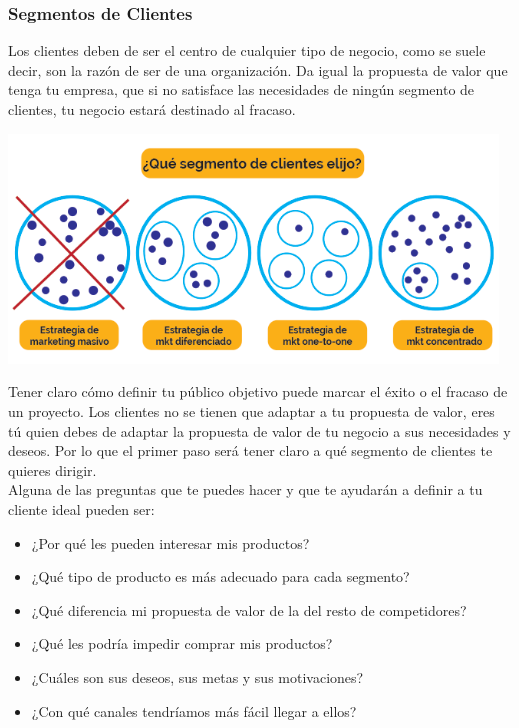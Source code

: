 \documentclass[preprint,12pt]{elsarticle}
\begin{document}
\subsubsection{Segmentos de Clientes}
Los clientes deben de ser el centro de cualquier tipo de negocio, como se suele decir, son la razón de ser de una organización.
Da igual la propuesta de valor que tenga tu empresa, que si no satisface las necesidades de ningún segmento de clientes, tu negocio estará destinado al fracaso.	
	\begin{center}
	\includegraphics[width=13cm]{./Imagenes/canvas1}
	\end{center}
Tener claro cómo definir tu público objetivo puede marcar el éxito o el fracaso de un proyecto.
Los clientes no se tienen que adaptar a tu propuesta de valor, eres tú quien debes de adaptar la propuesta de valor de tu negocio a sus necesidades y deseos.
Por lo que el primer paso será tener claro a qué segmento de clientes te quieres dirigir.\\
Alguna de las preguntas que te puedes hacer y que te ayudarán a definir a tu cliente ideal pueden ser:\\
\begin{itemize}
\item ¿Por qué les pueden interesar mis productos?
\item ¿Qué tipo de producto es más adecuado para cada segmento?
\item ¿Qué diferencia mi propuesta de valor de la del resto de competidores?
\item ¿Qué les podría impedir comprar mis productos?
\item ¿Cuáles son sus deseos, sus metas y sus motivaciones?
\item ¿Con qué canales tendríamos más fácil llegar a ellos?
\end{itemize}
\end{document}
